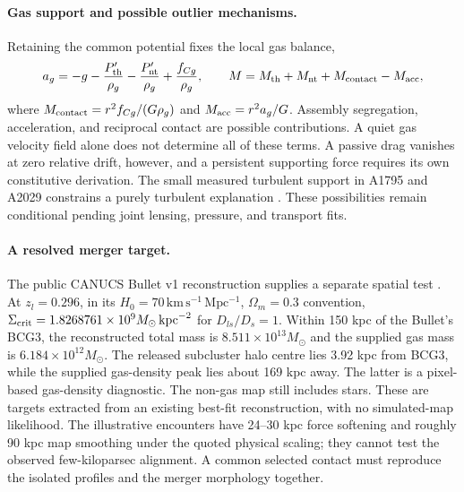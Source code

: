 \paragraph{Gas support and possible outlier mechanisms.}
Retaining the common potential fixes the local gas balance,
\[
a_g=-g-\frac{P_{\rm th}'}{\rho_g}
       -\frac{P_{\rm nt}'}{\rho_g}+\frac{f_{Cg}}{\rho_g},\qquad
M=M_{\rm th}+M_{\rm nt}+M_{\rm contact}-M_{\rm acc},
\]
where $M_{\rm contact}=r^2f_{Cg}/(G\rho_g)$ and
$M_{\rm acc}=r^2a_g/G$. Assembly segregation, acceleration, and reciprocal
contact are possible contributions. A quiet gas velocity field alone
does not determine all of these terms. A passive drag vanishes at zero
relative drift, however, and a persistent supporting force requires its
own constitutive derivation. The small measured turbulent support in
A1795 and A2029 constrains a purely turbulent explanation
\citep{Sarkar2026Cluster,XRISM2025Cluster}. These possibilities remain
conditional pending joint lensing, pressure, and transport fits.

\paragraph{A resolved merger target.}
The public CANUCS Bullet v1 reconstruction supplies a separate spatial
test \citep{Rihtarsic2026Cluster}. At $z_l=0.296$, in its
$H_0=70\,\mathrm{km\,s^{-1}\,Mpc^{-1}}$, $\Omega_m=0.3$ convention,
$\Sigma_{\rm crit}=1.8268761\times10^9M_\odot\,\mathrm{kpc}^{-2}$
for $D_{ls}/D_s=1$. Within 150 kpc of the Bullet's BCG3, the reconstructed
total mass is $8.511\times10^{13}M_\odot$ and the supplied gas mass is
$6.184\times10^{12}M_\odot$. The released subcluster halo centre lies
3.92 kpc from BCG3, while the supplied gas-density peak lies about
169 kpc away. The latter is a pixel-based gas-density diagnostic.
The non-gas map still includes stars. These are targets extracted from
an existing best-fit reconstruction, with no simulated-map likelihood.
The illustrative encounters have 24--30 kpc force softening and roughly
90 kpc map smoothing under the quoted physical scaling; they cannot test
the observed few-kiloparsec alignment. A common selected contact must
reproduce the isolated profiles and the merger morphology together.


